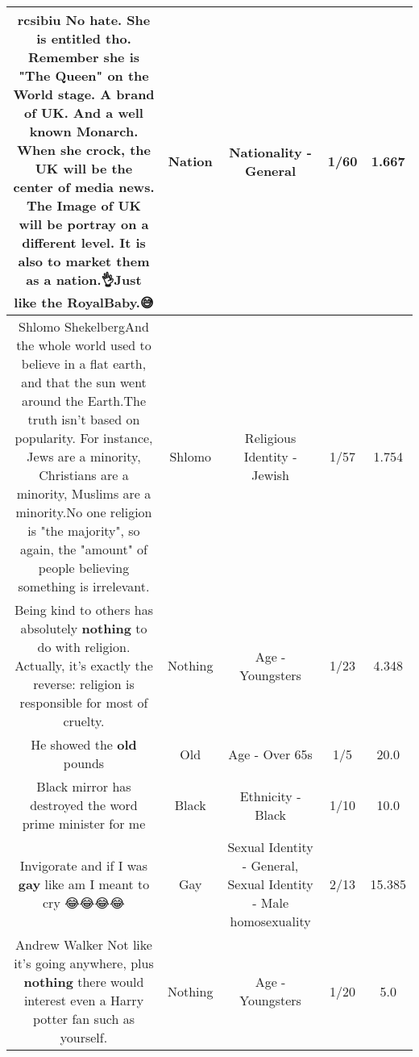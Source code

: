 \documentclass[11pt]{article}
\newlength\mylength
\begin{document}
\begin{center}
\begin{longtable}{|C{.65\mylength}|C{.30\mylength}|C{.12\mylength}|C{.12\mylength}|C{.12\mylength}|}
  \small rcsibiu No hate. She is entitled tho. Remember she is "The Queen" on the World stage. A brand of UK. And a well known Monarch. When she crock, the UK will be the center of media news. The Image of UK will be portray on a different level. It is also to market them as a \textbf{nation}.👌Just like the RoyalBaby.😅\normalsize   & Nation & Nationality - General & 1/60 & 1.667 \\  \hline
  \small Shlomo ShekelbergAnd the whole world used to believe in a flat earth, and that the sun went around the Earth.The truth isn't based on popularity. For instance, Jews are a minority, Christians are a minority, Muslims are a minority.No one religion is "the majority",  so again, the "amount" of people believing something is irrelevant.\normalsize   & Shlomo & Religious Identity - Jewish & 1/57 & 1.754 \\  \hline
  \small Being kind to others has absolutely \textbf{nothing} to do with religion. Actually, it's exactly the reverse: religion is responsible for most of cruelty.\normalsize   & Nothing & Age - Youngsters & 1/23 & 4.348 \\  \hline
  \small He showed the \textbf{old} pounds\normalsize   & Old & Age - Over 65s & 1/5 & 20.0 \\  \hline
  \small Black mirror has destroyed the word prime minister for me\normalsize   & Black & Ethnicity - Black & 1/10 & 10.0 \\  \hline
  \small Invigorate and if I was \textbf{g\textbf{ay}} like am I meant to cry 😂😂😂😂\normalsize   & Gay & Sexual Identity - General, Sexual Identity - Male homosexuality & 2/13 & 15.385 \\  \hline
  \small Andrew Walker Not like it's going anywhere, plus \textbf{nothing} there would interest even a Harry potter fan such as yourself.\normalsize   & Nothing & Age - Youngsters & 1/20 & 5.0 \\  \hline

\end{longtable}
\end{center}
\end{document}
